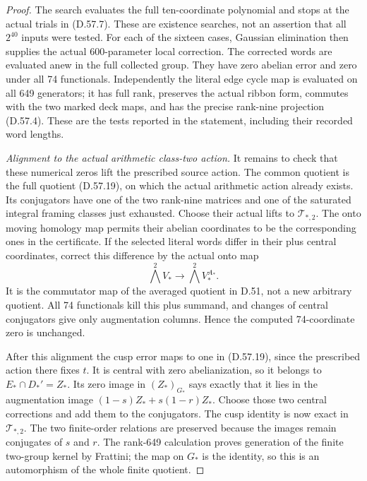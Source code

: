 \begin{proof}
The search evaluates the full ten-coordinate
polynomial and stops at the actual trials in
(D.57.7). These are existence searches, not an
assertion that all \(2^{40}\) inputs were tested.
For each of the sixteen cases, Gaussian elimination
then supplies the actual 600-parameter local
correction. The corrected words are evaluated
anew in the full collected group. They have
zero abelian error and zero under all 74
functionals. Independently the literal edge
cycle map is evaluated on all 649 generators;
it has full rank, preserves the actual ribbon
form, commutes with the two marked deck maps,
and has the precise rank-nine projection
(D.57.4). These are the tests reported in the
statement, including their recorded word lengths.

\emph{Alignment to the actual arithmetic class-two action.}
It remains to check that these numerical zeros
lift the prescribed source action. The common
quotient is the full quotient (D.57.19), on
which the actual arithmetic action already
exists. Its conjugators have one of the two
rank-nine matrices and one of the saturated
integral framing classes just exhausted.
Choose their actual lifts to \(\mathcal T_{*,2}\).
The onto moving homology map permits their
abelian coordinates to be the corresponding
ones in the certificate. If the selected
literal words differ in their plus central
coordinates, correct this difference by the
actual onto map
\[
 \bigwedge^2 V_*\longrightarrow
          \bigwedge^2 V_*^{A_*}.
 \tag{D.57.26}
\]
It is the commutator map of the averaged
quotient in D.51, not a new arbitrary quotient.
All 74 functionals kill this plus summand,
and changes of central conjugators give only
augmentation columns. Hence the computed
74-coordinate zero is unchanged.

After this alignment the cusp error maps to
one in (D.57.19), since the prescribed action
there fixes \(t\). It is central with zero
abelianization, so it belongs to
\(E_*\cap D_*'=Z_*\). Its zero image in
\((Z_*)_{G_*}\) says exactly that it lies
in the augmentation image
\((1-s)Z_*+s(1-r)Z_*\). Choose those two
central corrections and add them to the
conjugators. The cusp identity is now exact
in \(\mathcal T_{*,2}\). The two finite-order
relations are preserved because the images
remain conjugates of \(s\) and \(r\).
The rank-649 calculation proves generation
of the finite two-group kernel by Frattini;
the map on \(G_*\) is the identity, so this
is an automorphism of the whole finite quotient.


\end{proof}

